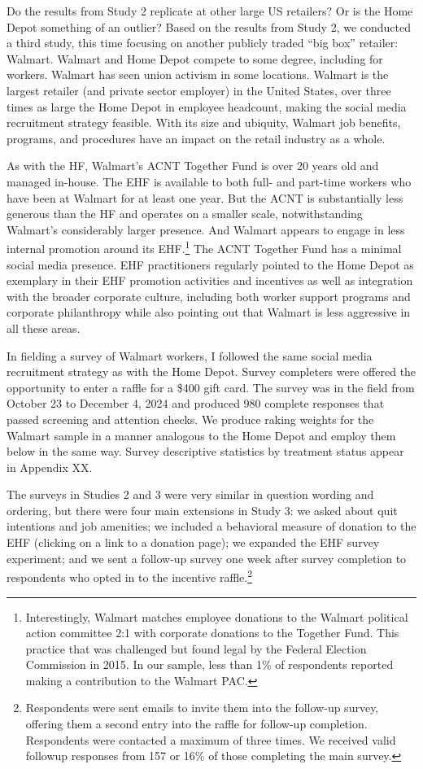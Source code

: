 \documentclass[
  11pt,
  oneside]{article}
\begin{document}
Do the results from Study 2 replicate at other large US retailers? Or is the Home Depot something of an outlier? Based on the results from Study 2, we conducted a third study, this time focusing on another publicly traded ``big box'' retailer: Walmart. Walmart and Home Depot compete to some degree, including for workers. Walmart has seen union activism in some locations. Walmart is the largest retailer (and private sector employer) in the United States, over three times as large the Home Depot in employee headcount, making the social media recruitment strategy feasible. With its size and ubiquity, Walmart job benefits, programs, and procedures have an impact on the retail industry as a whole.

As with the HF, Walmart's ACNT Together Fund is over 20 years old and managed in-house. The EHF is available to both full- and part-time workers who have been at Walmart for at least one year. But the ACNT is substantially less generous than the HF and operates on a smaller scale, notwithstanding Walmart's considerably larger presence. And Walmart appears to engage in less internal promotion around its EHF.\footnote{Interestingly, Walmart matches employee donations to the Walmart political action committee 2:1 with corporate donations to the Together Fund. This practice that was challenged but found legal by the Federal Election Commission in 2015. In our sample, less than 1\% of respondents reported making a contribution to the Walmart PAC.} The ACNT Together Fund has a minimal social media presence. EHF practitioners regularly pointed to the Home Depot as exemplary in their EHF promotion activities and incentives as well as integration with the broader corporate culture, including both worker support programs and corporate philanthropy while also pointing out that Walmart is less aggressive in all these areas.

In fielding a survey of Walmart workers, I followed the same social media recruitment strategy as with the Home Depot. Survey completers were offered the opportunity to enter a raffle for a \$400 gift card. The survey was in the field from October 23 to December 4, 2024 and produced 980 complete responses that passed screening and attention checks. We produce raking weights for the Walmart sample in a manner analogous to the Home Depot and employ them below in the same way. Survey descriptive statistics by treatment status appear in Appendix XX.

The surveys in Studies 2 and 3 were very similar in question wording and ordering, but there were four main extensions in Study 3: we asked about quit intentions and job amenities; we included a behavioral measure of donation to the EHF (clicking on a link to a donation page); we expanded the EHF survey experiment; and we sent a follow-up survey one week after survey completion to respondents who opted in to the incentive raffle.\footnote{Respondents were sent emails to invite them into the follow-up survey, offering them a second entry into the raffle for follow-up completion. Respondents were contacted a maximum of three times. We received valid followup responses from 157 or 16\% of those completing the main survey.}
\end{document}
